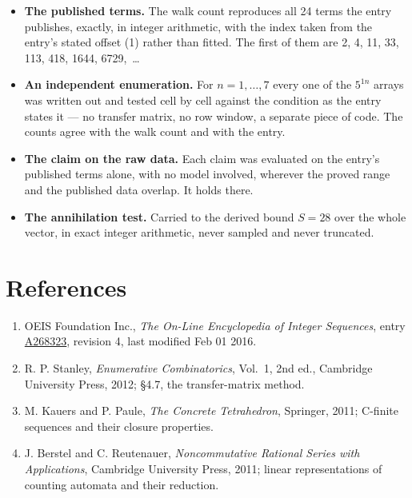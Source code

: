 \documentclass[11pt]{article}
\theoremstyle{definition}
\begin{document}
\begin{itemize}

\item {\bfseries The published terms.} The walk count reproduces all 24 terms the entry publishes, exactly, in integer arithmetic, with the index taken from the entry's stated offset (1) rather than fitted. The first of them are 2, 4, 11, 33, 113, 418, 1644, 6729,~\dots

\item {\bfseries An independent enumeration.} For $n = 1,\dots,7$ every one of the $5^{1n}$ arrays was written out and tested cell by cell against the condition as the entry states it --- no transfer matrix, no row window, a separate piece of code. The counts agree with the walk count and with the entry.

\item {\bfseries The claim on the raw data.} Each claim was evaluated on the entry's published terms alone, with no model involved, wherever the proved range and the published data overlap. It holds there.

\item {\bfseries The annihilation test.} Carried to the derived bound $S = 28$ over the whole vector, in exact integer arithmetic, never sampled and never truncated.

\end{itemize}

\section{References}

\begin{enumerate}

\item OEIS Foundation Inc., \emph{The On-Line Encyclopedia of Integer Sequences}, entry \href{https://oeis.org/A268323}{A268323}, revision 4, last modified Feb 01 2016.

\item R. P. Stanley, \emph{Enumerative Combinatorics}, Vol.~1, 2nd ed., Cambridge University Press, 2012; \S4.7, the transfer-matrix method.

\item M. Kauers and P. Paule, \emph{The Concrete Tetrahedron}, Springer, 2011; C-finite sequences and their closure properties.

\item J. Berstel and C. Reutenauer, \emph{Noncommutative Rational Series with Applications}, Cambridge University Press, 2011; linear representations of counting automata and their reduction.

\end{enumerate}
\end{document}
